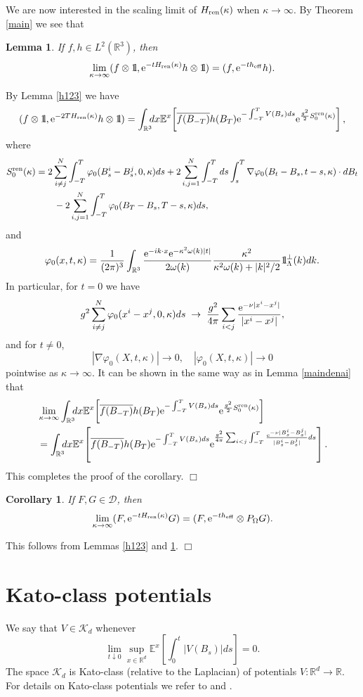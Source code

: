 \documentclass[11pt]{article}
\newtheorem{lemma}[theorem]{Lemma}
\newtheorem{corollary}[theorem]{Corollary}
\providecommand{\bc}[1]{\begin{corollary}\label{#1}}
\providecommand{\ec}{\end{corollary}}
\newcommand{\bl}[1]{\begin{lemma}\label{#1}}
\newcommand{\el}{\end{lemma}}
\def\bbbone{{\mathchoice {\rm 1\mskip-4mu l} {\rm 1\mskip-4mu l}
{\rm 1\mskip-4.5mu l} {\rm 1\mskip-5mu l}}}
\def\one{\bbbone}
\newcommand{\kp}{\one_\Lambda^\perp(k)}
\providecommand{\idx}{\int_{\BR} \!\!\! dx}
\newcommand{\Ebb}{{\mathbb E}}
\providecommand{\eq}[1]{\begin{equation}\label{#1}}
\providecommand{\en}{\end{equation}}
\providecommand{\qed}{\hfill {$\Box$}\par\medskip}
\providecommand{\BR}{{\mathbb{R}^3 }}
\providecommand{\iijj}{\sum_{i,j=1}^N}
\renewcommand{\ij}{\sum_{i\not=j}^N}
\providecommand{\RR}{\mathbb{R}}
\providecommand{\LR}{{L^2(\BR)}}
\providecommand{\ms}[1]{\mathscr{#1}}
\providecommand{\ov}[1]{\overline{#1}}
\providecommand{\non}{\nonumber}
\providecommand{\e}{{\rm e}}
\providecommand{\1}{\mathbb{1}}
\providecommand{\ren}{{\rm ren}}
\begin{document}
We are now interested in the scaling limit of $H_{\ren}(\kappa)$ when $\kappa\to\infty$. By Theorem
\ref{main} we see that
\bl{main4}
If $f,h\in\LR$, then
\eq{weakcouplinglimit}
\lim_{\kappa\to\infty}(f\otimes \one, \e^{-t H_\ren (\kappa)}h\otimes \one) =(f,\e^{-t h_{\rm eff}} h).
\en
\el
\proof
By Lemma \ref{h123} we have
\eq{sasa2121}
(f\otimes \one, \e^{-2T H_\ren (\kappa)}h\otimes \one) = \idx
\Ebb^x \! \left[\ov{f(B_{-T})} h(B_T)\e^{-\int_{-T}^T V(B_s) ds} \e^{\frac{g^2}{2} S_0^\ren (\kappa)}\right],
\en
where
\begin{align}\label{hiro}
S_0^\ren (\kappa)
&
= 2\ij\int_{-T}^T \varphi_0(B_s^i-B_s^j,0,\kappa)ds
+2\iijj \int_{-T}^T ds\int_s^T\nabla\varphi_0(B_t-B_s,t-s,\kappa) \cdot dB_t\non\\
&
\qquad -2\iijj \int_{-T}^T \varphi_0(B_T-B_s,T-s,\kappa)ds,
\end{align}
and
\eq{sasa33}
\varphi_0(x,t,\kappa)=\frac{1}{(2\pi)^3}\int_{\BR} \frac{\e^{-ik\cdot x} \e^{-\kappa^2\omega(k)|t|}}{2\omega(k)}
\frac{\kappa^2}{\kappa^2 \omega(k)+|k|^2/2}  \kp dk.
\en
In particular, for $t=0$ we have
$$
g^2\ij \varphi_0(x^i-x^j,0,\kappa)ds \;\to\; \frac{g^2}{4\pi} \sum_{i<j}\frac{\e^{-\nu|x^i-x^j|}} {|x^i-x^j|},
$$
and for $t\not=0$,
$$
|\nabla\varphi_0(X, t, \kappa)|\to 0, \quad |\varphi_0(X, t, \kappa)|\to 0
$$
pointwise as $\kappa\to\infty$. It can be shown in the same way as in Lemma \ref{maindenai} that
\begin{align*}
&
\lim_{\kappa\to\infty} \idx
\Ebb^x \! \left[\ov{f(B_{-T})} h(B_T)\e^{-\int_{-T}^T V(B_s) ds} \e^{\frac{g^2}{2} S_0^\ren (\kappa)}\right]\\
&=
\idx \Ebb^x\!\left[\ov{f(B_{-T})} h(B_T)\e^{-\int_{-T}^T V(B_s) ds} \e^{\frac{g^2}{4\pi}
\sum_{i<j} \int_{-T}^T \frac{\e^{-\nu|B^i_s-B^j_s|}} {|B^i_s-B^j_s|}ds} \right].
\end{align*}
This completes the proof of the corollary.
\qed
\bc{main5}
If $F, G\in\ms D$, then
\eq{weakcouplinglimit2}
\lim_{\kappa\to\infty}(F,  \e^{-t H_\ren (\kappa)} G) = (F,\e^{-t h_{\rm eff}}\otimes P_\Omega  G).
\en
\ec
\proof
This follows from Lemmas \ref{h123} and  \ref{main4}.
\qed


\appendix
\section{Kato-class potentials}
\label{appa}
We say that $V\in \ms K_d$ whenever
\eq{kato2}
\lim_{t\downarrow 0}\sup_{x\in\RR^d} \Ebb^x\!\left [\int_0^t |V(B_s)|ds\right ]=0.
\en
The space $\ms K_d$ is Kato-class (relative to the Laplacian) of potentials $V: \RR^d \to \RR$. For details
on Kato-class potentials we refer to \cite[Chapter 3.3]{lhb11} and \cite{as82, cfks08}.
\end{document}
